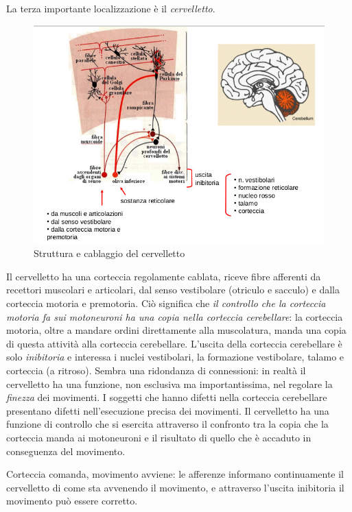 \documentclass[a4paper,12pt]{article}
\begin{document}
La terza importante localizzazione è il \emph{cervelletto}. 
\begin{figure}[H]
\centering
\includegraphics[scale=0.4]{immagine/cervelletto.jpg}
\caption{Struttura e cablaggio del cervelletto}
\end{figure}
Il cervelletto ha una corteccia regolamente cablata, riceve fibre afferenti da recettori muscolari e articolari, dal senso vestibolare (otriculo e sacculo) e dalla corteccia motoria e premotoria. Ciò significa che \emph{il controllo che la corteccia motoria fa sui motoneuroni ha una copia nella corteccia cerebellare}: la corteccia motoria, oltre a mandare ordini direttamente alla muscolatura, manda una copia di questa attività alla corteccia cerebellare. L'uscita della corteccia cerebellare è solo \emph{inibitoria} e interessa i nuclei vestibolari, la formazione vestibolare, talamo e corteccia (a ritroso). Sembra una ridondanza di connessioni: in realtà il cervelletto ha una funzione, non esclusiva ma importantissima, nel regolare la \emph{finezza} dei movimenti. I soggetti che hanno difetti nella corteccia cerebellare presentano difetti nell'esecuzione precisa dei movimenti. Il cervelletto ha una funzione di controllo che si esercita attraverso il confronto tra la copia che la corteccia manda ai motoneuroni e il risultato di quello che è accaduto in conseguenza del movimento.

Corteccia comanda, movimento avviene: le afferenze informano continuamente il cervelletto di come sta avvenendo il movimento, e attraverso l'uscita inibitoria il movimento può essere corretto.
\end{document}
